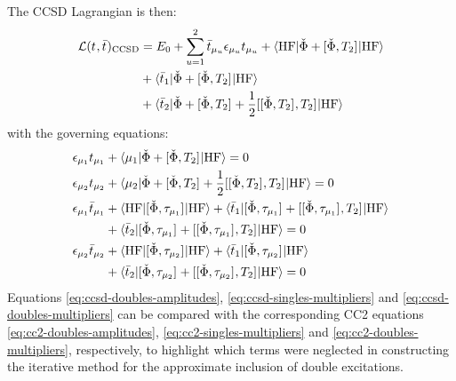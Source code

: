 The \acrshort{CCSD} Lagrangian is then:
\begin{equation}\label{eq:ccsd-lagrangian}
 \begin{aligned}
 \mathcal{L}(t_{}, \bar{t}_{})_\mathrm{CCSD}
&=
 E_0
 + \sum_{u=1}^{2}\bar{t}_{\mu_u}\epsilon_{\mu_u}t_{\mu_u}
 + \braket{\mathrm{HF} | \check{\Phi} + [ \check{\Phi}, T_2 ]^{} | \mathrm{HF}} \\
 &+ \braket{\bar{t}_{1} | \check{\Phi} + [ \check{\Phi}, T_2 ]^{} | \mathrm{HF}} \\
 &+ \braket{\bar{t}_{2} | \check{\Phi} + [ \check{\Phi}, T_2 ]^{}
   +\frac{1}{2}[ [ \check{\Phi}, T_2 ]^{}, T_2 ]^{} | \mathrm{HF}}
  \end{aligned}
\end{equation}
with the governing equations:
\begin{subequations}\label{eq:ccsd-equations}
  \begin{align}
   \epsilon_{\mu_1}t_{\mu_1} &+ \braket{\mu_1 | \check{\Phi} + [ \check{\Phi}, T_2 ]^{} | \mathrm{HF}}
             = 0 \label{eq:ccsd-singles-amplitudes}\\
   \epsilon_{\mu_2}t_{\mu_2} &+
   \braket{\mu_2 | \check{\Phi} + [ \check{\Phi}, T_2 ]^{} +\frac{1}{2}[ [ \check{\Phi}, T_2 ]^{}, T_2 ]^{} | \mathrm{HF}}
             = 0 \label{eq:ccsd-doubles-amplitudes}\\
    \epsilon_{\mu_1}\bar{t}_{\mu_1} &+
    \braket{\mathrm{HF} | [ \check{\Phi}, \tau_{\mu_1} ]^{} | \mathrm{HF}} +
    \braket{\bar{t}_{1} |
      [ \check{\Phi}, \tau_{\mu_1} ]^{}
    + [ [ \check{\Phi}, \tau_{\mu_1} ]^{}, T_2 ]^{}
    | \mathrm{HF}} \nonumber \\
   &+ \braket{\bar{t}_{2} |
      [ \check{\Phi}, \tau_{\mu_1} ]^{}
    + [ [ \check{\Phi}, \tau_{\mu_1} ]^{}, T_2 ]^{}
    | \mathrm{HF}}
             = 0 \label{eq:ccsd-singles-multipliers} \\
    \epsilon_{\mu_2}\bar{t}_{\mu_2} &+
    \braket{\mathrm{HF} | [ \check{\Phi}, \tau_{\mu_2} ]^{} | \mathrm{HF}} +
    \braket{\bar{t}_{1} |
      [ \check{\Phi}, \tau_{\mu_2} ]^{}
    | \mathrm{HF}} \nonumber \\
   &+ \braket{\bar{t}_{2} |
      [ \check{\Phi}, \tau_{\mu_2} ]^{}
    + [ [ \check{\Phi}, \tau_{\mu_2} ]^{}, T_2 ]^{}
    | \mathrm{HF}}
             = 0 \label{eq:ccsd-doubles-multipliers}
  \end{align}
\end{subequations}
Equations \eqref{eq:ccsd-doubles-amplitudes},
\eqref{eq:ccsd-singles-multipliers} and \eqref{eq:ccsd-doubles-multipliers} can
be compared with the corresponding \acrshort{CC2} equations
\eqref{eq:cc2-doubles-amplitudes}, \eqref{eq:cc2-singles-multipliers} and
\eqref{eq:cc2-doubles-multipliers}, respectively, to highlight which terms were neglected in
constructing the iterative method for the approximate inclusion of double excitations.

